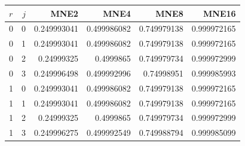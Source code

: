 \begin{tabular}{@{}lrrrrr@{}}
\toprule
$r$ & $j$ & MNE2 & MNE4 & MNE8 & MNE16 \\ \midrule
0 & 0 & 0.249993041 & 0.499986082 & 0.749979138 & 0.999972165 \\
0 & 1 & 0.249993041 & 0.499986082 & 0.749979138 & 0.999972165 \\
0 & 2 & 0.24999325 & 0.4999865 & 0.749979734 & 0.999972999 \\
0 & 3 & 0.249996498 & 0.499992996 & 0.74998951 & 0.999985993 \\
1 & 0 & 0.249993041 & 0.499986082 & 0.749979138 & 0.999972165 \\
1 & 1 & 0.249993041 & 0.499986082 & 0.749979138 & 0.999972165 \\
1 & 2 & 0.24999325 & 0.4999865 & 0.749979734 & 0.999972999 \\
1 & 3 & 0.249996275 & 0.499992549 & 0.749988794 & 0.999985099 \\
\bottomrule
\end{tabular}

